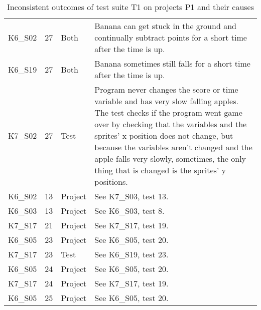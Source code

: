 \begin{table}[htpb]
{\begin{tabular}{lrlp{11.25cm}}
        K6\_S02 & 27   & Both    & Banana can get stuck in the ground and continually subtract points for a short time after the time is up. \\
        K6\_S19 & 27   & Both    & Banana sometimes still falls for a short time after the time is up. \\
        K7\_S02 & 27   & Test    & Program never changes the score or time variable and has very slow falling apples.
                                   The test checks if the program went game over by checking that the variables and the sprites' x position does not change,
                                   but because the variables aren't changed and the apple falls very slowly, sometimes, the only thing that is changed is the sprites' y positions. \\
        \midrule
        K6\_S02 & 13   & Project & See K7\_S03, test 13. \\
        K6\_S03 & 13   & Project & See K6\_S03, test 8.  \\
        K7\_S17 & 21   & Project & See K7\_S17, test 19. \\
        K6\_S05 & 23   & Project & See K6\_S05, test 20. \\
        K7\_S17 & 23   & Test    & See K6\_S19, test 23. \\
        K6\_S05 & 24   & Project & See K6\_S05, test 20. \\
        K7\_S17 & 24   & Project & See K7\_S17, test 19. \\
        K6\_S05 & 25   & Project & See K6\_S05, test 20. \\
        \bottomrule
    \end{tabular}
    }
    \caption{Inconsistent outcomes of test suite T1 on projects P1 and their causes}
    \label{tab:inconsistencies_causes_normal}
\end{table}


